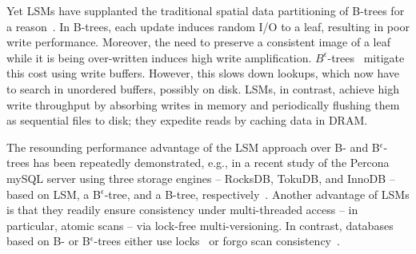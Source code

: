 Yet  LSMs have supplanted the  traditional spatial data partitioning of B-trees for a reason~\cite{rocks-vs-inno}.
In  B-trees, each update induces random I/O  to a leaf, resulting in poor write performance.
Moreover, the need to preserve a consistent image of a leaf while it is being over-written induces high write amplification. 
$B^{\epsilon}$-trees~\cite{Brodal:2003:LBE:644108.644201} mitigate this cost using write buffers. %
However, this slows down lookups, which now have to search in unordered buffers, possibly on disk. 
%
LSMs, in contrast, achieve high write throughput by absorbing  writes in memory and periodically flushing them as 
sequential files to disk; they expedite reads by caching data in DRAM.

The resounding performance advantage of the LSM approach over B- and B$^{\epsilon}$-trees has been repeatedly demonstrated, 
e.g., in a recent  study of the Percona mySQL server using three storage engines -- RocksDB, TokuDB, and InnoDB --
based on LSM, a B$^{\epsilon}$-tree, and a B-tree, respectively~\cite{toku-rocks-inno}.
%
Another advantage of LSMs is that they readily ensure consistency under multi-threaded access -- in particular, atomic scans --   
via lock-free multi-versioning.
In contrast, databases based on B- or  B$^\epsilon$-trees either use locks~\cite{innodblocking} 
or forgo scan consistency~\cite{tucana}.



 
